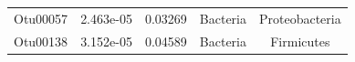 \documentclass[]{article}
\begin{document}
\begin{longtable}[]{@{}ccccc@{}}
\midrule
\endhead
\begin{minipage}[t]{0.13\columnwidth}\centering\strut
Otu00057\strut
\end{minipage} & \begin{minipage}[t]{0.14\columnwidth}\centering\strut
2.463e-05\strut
\end{minipage} & \begin{minipage}[t]{0.12\columnwidth}\centering\strut
0.03269\strut
\end{minipage} & \begin{minipage}[t]{0.13\columnwidth}\centering\strut
Bacteria\strut
\end{minipage} & \begin{minipage}[t]{0.19\columnwidth}\centering\strut
Proteobacteria\strut
\end{minipage}\tabularnewline
\begin{minipage}[t]{0.13\columnwidth}\centering\strut
Otu00138\strut
\end{minipage} & \begin{minipage}[t]{0.14\columnwidth}\centering\strut
3.152e-05\strut
\end{minipage} & \begin{minipage}[t]{0.12\columnwidth}\centering\strut
0.04589\strut
\end{minipage} & \begin{minipage}[t]{0.13\columnwidth}\centering\strut
Bacteria\strut
\end{minipage} & \begin{minipage}[t]{0.19\columnwidth}\centering\strut
Firmicutes\strut
\end{minipage}\tabularnewline
\bottomrule
\end{longtable}
\end{document}
